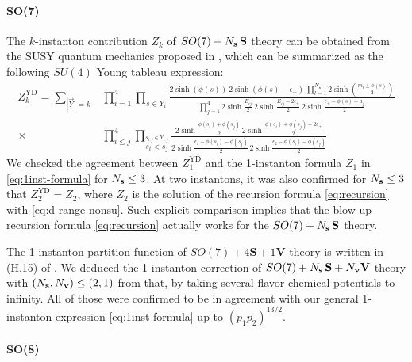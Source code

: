 \documentclass[letterpaper, 11pt]{article}
\def\e{\epsilon}
\begin{document}
{\paragraph{SO(7)} The $k$-instanton contribution $Z_k$ of $SO(7) + N_{\bf s}\,\mathbf{S}$ theory can be obtained from the SUSY quantum mechanics proposed in  \cite{Kim:2018gjo}, which can be summarized as the following $SU(4)$ Young tableau expression:
\begin{align}
  Z_k^\text{YD} = \sum_{|\vec{Y}| = k} &\prod_{i=1}^4\prod_{s \in Y_i}\frac{2\sinh{(\phi(s))} \ 2\sinh{(\phi(s)-\e_+)} \ \prod_{l=1}^{N_\textbf{s}}2\sinh(\frac{m_l \pm \phi(s)}{2}) }{\prod_{j=1}^4 2\sinh{\frac{E_{ij}}{2}}\,2\sinh{\frac{E_{ij}-2\e_+}{2}}\,2\sinh{\frac{\e_+ - \phi(s) - a_j}{2}}} \\ \times &\prod_{i \leq j}^4 \prod_{\stackrel{s_{i,j} \in Y_{i,j}}{s_i < s_j}} \frac{2\sinh{\frac{\phi(s_i)+\phi(s_j)}{2}}\, 2\sinh{\frac{\phi(s_i)+\phi(s_j)-2\e_+}{2}}}{ 2\sinh{\frac{\e_1 - \phi(s_i)-\phi(s_j)}{2}} \, 2\sinh{\frac{\e_2 - \phi(s_i)-\phi(s_j)}{2}}}
\end{align}
We checked the agreement between $Z_1^\text{YD}$ and the 1-instanton formula $Z_1$ in \eqref{eq:1inst-formula} for $N_{\bf s} \leq 3$. At two instantons, it was also confirmed for $N_{\bf s} \leq 3$ that $Z_2^\text{YD} = Z_2$, where $Z_2$ is  the solution of the recursion formula \eqref{eq:recursion} with \eqref{eq:d-range-nonsu}. Such explicit comparison implies that the blow-up recursion formula \eqref{eq:recursion} actually works for the $SO(7) + N_{\bf s}\,\mathbf{S}$ theory. 

The 1-instanton partition function of $SO(7) + 4\mathbf{S} + 1\mathbf{V}$  theory is written in (H.15) of \cite{DelZotto:2018tcj}.
We deduced the 1-instanton correction of $SO(7) + N_{\bf s}\,\mathbf{S} + N_{\bf v}\mathbf{V}$ theory with $( N_{\bf s}, N_{\bf v}) \leq ( 2,1)$  from that,   by taking several flavor chemical potentials to infinity. All of those were confirmed to be in agreement with our general 1-instanton expression \eqref{eq:1inst-formula} up to $(p_1p_2)^{13/2}$.

\paragraph{SO(8)}

}
\end{document}
